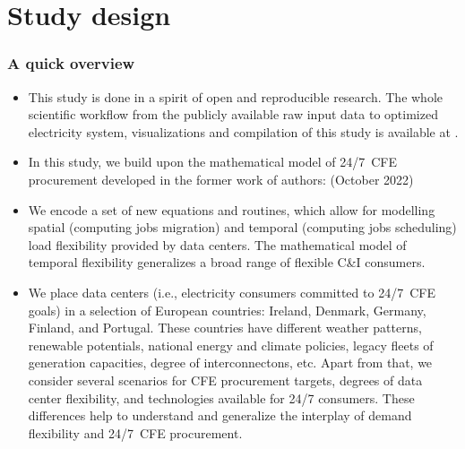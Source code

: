 \section{Study design}


\begin{frame}
  \frametitle{A quick overview}

{\footnotesize
  \begin{itemize}
    
    \item This study is done in a spirit of open and reproducible research. The whole scientific workflow from the publicly available raw input data to optimized electricity system, visualizations and compilation of this study is available at . 
    
    \item In this study, we build upon the mathematical model of 24/7~CFE procurement developed in the former work of authors:  (October 2022)
    
    \item We encode a set of new equations and routines, which allow for modelling \alert{spatial} (computing jobs migration) and \alert{temporal} (computing jobs scheduling) load flexibility provided by data centers. The mathematical model of temporal flexibility generalizes a broad range of flexible C\&I consumers.

    \item We place data centers (i.e., electricity consumers committed to 24/7~CFE goals) in a selection of European countries: Ireland, Denmark, Germany, Finland, and Portugal. These countries have different weather patterns, renewable potentials, national energy and climate policies, legacy fleets of generation capacities, degree of interconnectons, etc.
    Apart from that, we consider several scenarios for CFE procurement targets, degrees of data center flexibility, and technologies available for 24/7 consumers. These differences help to \alert{understand and generalize} the interplay of demand flexibility and 24/7~CFE procurement.

  \end{itemize}
}
\end{frame}


